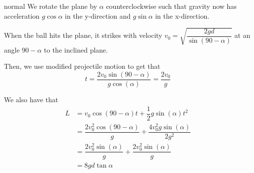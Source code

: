 \begin{solution}{normal}
We rotate the plane by $\alpha$ counterclockwise such that gravity now has acceleration $g\cos\alpha$ in the y-direction and $g\sin\alpha$ in the x-direction. \vspace{3mm}

When the ball hits the plane, it strikes with velocity $v_0=\sqrt{\dfrac{2gd}{\sin\left(90-\alpha\right)}}$ at an angle $90-\alpha$ to the inclined plane. \vspace{3mm}

Then, we use modified projectile motion to get that
$$t=\dfrac{2v_0\sin\left(90-\alpha\right)}{g\cos\left(\alpha\right)}=\dfrac{2v_0}{g}$$

We also have that
\begin{align*}
L&=v_0\cos\left(90-\alpha\right)t+\dfrac{1}{2}g\sin\left(\alpha\right) t^2 \\
&=\dfrac{2v_0^2\cos\left(90-\alpha\right)}{g}+\dfrac{4v_0^2g\sin\left(\alpha\right)}{2g^2}\\
&=\dfrac{2v_0^2\sin\left(\alpha\right)}{g}+\dfrac{2v_0^2\sin\left(\alpha\right)}{g}\\
&=\boxed{8gd\tan\alpha}
\end{align*}
\end{solution}
\newpage